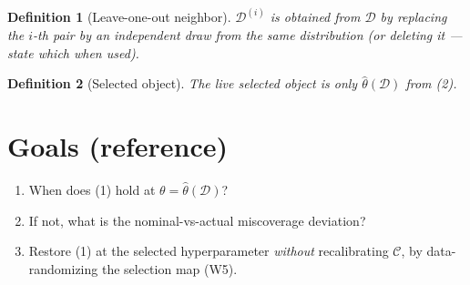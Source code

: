 \documentclass[11pt]{article}
\newtheorem{definition}{Definition}
\begin{document}
\begin{definition}[Leave-one-out neighbor]
$\mathcal{D}^{(i)}$ is obtained from $\mathcal{D}$ by replacing the $i$-th pair
by an independent draw from the same distribution (or deleting it --- state which
when used).
\end{definition}

\begin{definition}[Selected object]
The live selected object is only $\hat\theta(\mathcal{D})$ from (2).
\end{definition}

\section{Goals (reference)}
\begin{enumerate}
  \item[(i)] When does (1) hold at $\theta=\hat\theta(\mathcal{D})$?
  \item[(ii)] If not, what is the nominal-vs-actual miscoverage deviation?
  \item[(iii)] Restore (1) at the selected hyperparameter \emph{without} recalibrating
  $\mathcal{C}$, by data-randomizing the selection map (W5).
\end{enumerate}
\end{document}
